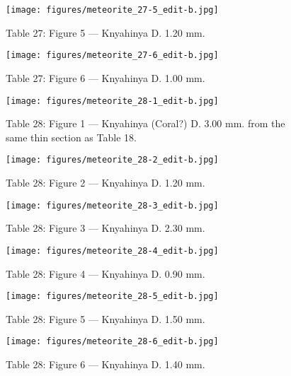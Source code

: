 \documentclass[a4paper, 12pt, oneside]{article}
\begin{document}
\clearpage
\begin{figure}[t]
\texttt{[image: figures/meteorite\_27-5\_edit-b.jpg]}
\caption{Table 27: Figure 5 --- Knyahinya D. 1.20 mm.}
\centering
\end{figure}
\clearpage
\begin{figure}[t]
\texttt{[image: figures/meteorite\_27-6\_edit-b.jpg]}
\caption{Table 27: Figure 6 --- Knyahinya D. 1.00 mm.}
\centering
\end{figure}
\clearpage
{}
\begin{figure}[t]
\texttt{[image: figures/meteorite\_28-1\_edit-b.jpg]}
\caption{Table 28: Figure 1 --- Knyahinya (Coral?) D. 3.00 mm. from the same thin section as Table 18.}
\centering
\end{figure}
\clearpage
\begin{figure}[t]
\texttt{[image: figures/meteorite\_28-2\_edit-b.jpg]}
\caption{Table 28: Figure 2 --- Knyahinya D. 1.20 mm.}
\centering
\end{figure}
\clearpage
\begin{figure}[t]
\texttt{[image: figures/meteorite\_28-3\_edit-b.jpg]}
\caption{Table 28: Figure 3 --- Knyahinya D. 2.30 mm.}
\centering
\end{figure}
\clearpage
\begin{figure}[t]
\texttt{[image: figures/meteorite\_28-4\_edit-b.jpg]}
\caption{Table 28: Figure 4 --- Knyahinya D. 0.90 mm.}
\centering
\end{figure}
\clearpage
\begin{figure}[t]
\texttt{[image: figures/meteorite\_28-5\_edit-b.jpg]}
\caption{Table 28: Figure 5 --- Knyahinya D. 1.50 mm.}
\centering
\end{figure}
\clearpage
\begin{figure}[t]
\texttt{[image: figures/meteorite\_28-6\_edit-b.jpg]}
\caption{Table 28: Figure 6 --- Knyahinya D. 1.40 mm.}
\centering
\end{figure}
\end{document}
